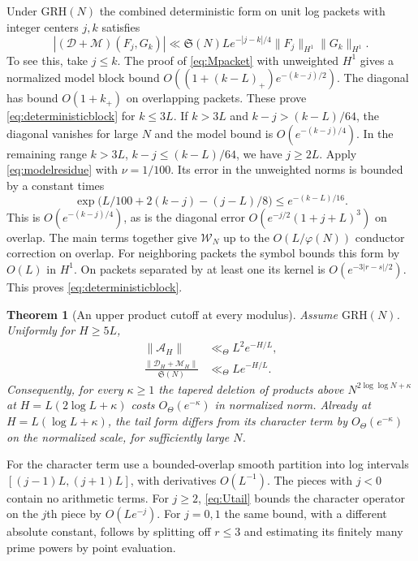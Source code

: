 \documentclass[11pt,a4paper]{article}
\numberwithin{equation}{section}
\newtheorem{theorem}{Theorem}[section]
\newcommand{\SSS}{\mathfrak S}
\newcommand{\grh}{\mathrm{GRH}}
\begin{document}
Under $\grh(N)$ the combined deterministic form on unit log
packets with integer centers $j,k$ satisfies
\begin{equation}
 |(\mathcal D+\mathcal M)(F_j,G_k)|
       \ll \SSS(N)L e^{-|j-k|/4}\|F_j\|_{H^1}\|G_k\|_{H^1}.
 \label{eq:deterministicblock}
\end{equation}
To see this, take $j\le k$. The proof of \cref{eq:Mpacket}
with unweighted $H^1$ gives a normalized model block bound
$O((1+(k-L)_+)e^{-(k-j)/2})$. The diagonal has bound $O(1+k_+)$
on overlapping packets. These prove \cref{eq:deterministicblock}
for $k\le3L$. If $k>3L$ and $k-j>(k-L)/64$, the diagonal
vanishes for large $N$ and the model bound is $O(e^{-(k-j)/4})$.
In the remaining range $k>3L$, $k-j\le(k-L)/64$, we have $j\ge2L$.
Apply \cref{eq:modelresidue} with $\nu=1/100$.
Its error in the unweighted norms is bounded by a constant times
\[
 \exp\bigl(L/100+2(k-j)-(j-L)/8\bigr)\le e^{-(k-L)/16}.
\]
This is $O(e^{-(k-j)/4})$, as is the diagonal error
$O(e^{-j/2}(1+j+L)^3)$ on overlap.
The main terms together give $\mathcal W_N$ up to the
$O(L/\varphi(N))$ conductor correction on overlap.
For neighboring packets the symbol bounds this form by
$O(L)$ in $H^1$. On packets separated by at least one
its kernel is $O(e^{-3|r-s|/2})$.
This proves \cref{eq:deterministicblock}.

\begin{theorem}[An upper product cutoff at every modulus]
\label{thm:upperproduct}
Assume $\grh(N)$. Uniformly for $H\ge5L$,
\begin{align}
 \|\mathcal A_H\| &\ll_\Theta L^2 e^{-H/L},
       \label{eq:uppercharacter}\\
 \frac{\|\mathcal D_H+\mathcal M_H\|}{\SSS(N)}
       &\ll_\Theta L e^{-H/L}.
       \label{eq:uppermodel}
\end{align}
Consequently, for every $\kappa\ge1$ the tapered deletion of
products above $N^{2\log\log N+\kappa}$ at
$H=L(2\log L+\kappa)$ costs
$O_\Theta(e^{-\kappa})$ in normalized norm.
Already at $H=L(\log L+\kappa)$, the tail form differs from
its character term by $O_\Theta(e^{-\kappa})$
on the normalized scale, for sufficiently large $N$.
\end{theorem}

For the character term use a bounded-overlap smooth partition
into log intervals $[(j-1)L,(j+1)L]$, with derivatives
$O(L^{-1})$. The pieces with $j<0$ contain no arithmetic
terms. For $j\ge2$, \cref{eq:Utail} bounds the character
operator on the $j$th piece by $O(Le^{-j})$. For $j=0,1$
the same bound, with a different absolute constant, follows
by splitting off $r\le3$ and estimating its finitely many
prime powers by point evaluation.
\end{document}
